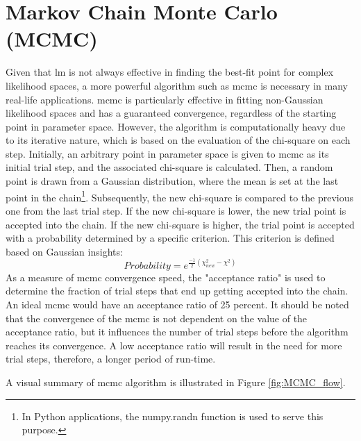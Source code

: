 \documentclass[12pt, TexShade, letterpaper]{report}
\begin{document}
\section{Markov Chain Monte Carlo (MCMC)}
Given that \gls{lm} is not always effective in finding the best-fit point for complex likelihood spaces, a more powerful algorithm such as \gls{mcmc} is necessary in many real-life applications. \gls{mcmc} is particularly effective in fitting non-Gaussian likelihood spaces and has a guaranteed convergence, regardless of the starting point in parameter space. However, the algorithm is computationally heavy due to its iterative nature, which is based on the evaluation of the chi-square on each step. Initially, an arbitrary point in parameter space is given to \gls{mcmc} as its initial trial step, and the associated chi-square is calculated. Then, a random point is drawn from a Gaussian distribution, where the mean is set at the last point in the chain\footnote{In Python applications, the numpy.randn function is used to serve this purpose.}. Subsequently, the new chi-square is compared to the previous one from the last trial step. If the new chi-square is lower, the new trial point is accepted into the chain. If the new chi-square is higher, the trial point is accepted with a probability determined by a specific criterion. This criterion is defined based on Gaussian insights:
\begin{equation}
    Probability = e^{\frac{-1}{2}\left(\chi_{new}^2 - \chi^2\right)} 
    \label{eq:mcmc_probability}
\end{equation}
As a measure of \gls{mcmc} convergence speed, the "acceptance ratio" is used to determine the fraction of trial steps that end up getting accepted into the chain. An ideal \gls{mcmc} would have an acceptance ratio of 25 percent. It should be noted that the convergence of the \gls{mcmc} is not dependent on the value of the acceptance ratio, but it influences the number of trial steps before the algorithm reaches its convergence. A low acceptance ratio will result in the need for more trial steps, therefore, a longer period of run-time.\par
A visual summary of \gls{mcmc} algorithm is illustrated in Figure \ref{fig:MCMC_flow}.
\end{document}

